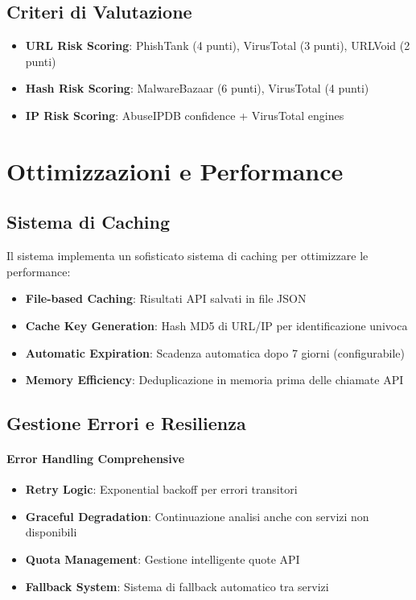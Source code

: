 \documentclass{article}
\begin{document}
\subsection{Criteri di Valutazione}

\begin{itemize}
    \item \textbf{URL Risk Scoring}: PhishTank (4 punti), VirusTotal (3 punti), URLVoid (2 punti)
    \item \textbf{Hash Risk Scoring}: MalwareBazaar (6 punti), VirusTotal (4 punti)
    \item \textbf{IP Risk Scoring}: AbuseIPDB confidence + VirusTotal engines
\end{itemize}

\section{Ottimizzazioni e Performance}

\subsection{Sistema di Caching}

Il sistema implementa un sofisticato sistema di caching per ottimizzare le performance:

\begin{itemize}
    \item \textbf{File-based Caching}: Risultati API salvati in file JSON
    \item \textbf{Cache Key Generation}: Hash MD5 di URL/IP per identificazione univoca
    \item \textbf{Automatic Expiration}: Scadenza automatica dopo 7 giorni (configurabile)
    \item \textbf{Memory Efficiency}: Deduplicazione in memoria prima delle chiamate API
\end{itemize}

\subsection{Gestione Errori e Resilienza}

\paragraph{Error Handling Comprehensive}

\begin{itemize}
    \item \textbf{Retry Logic}: Exponential backoff per errori transitori
    \item \textbf{Graceful Degradation}: Continuazione analisi anche con servizi non disponibili
    \item \textbf{Quota Management}: Gestione intelligente quote API
    \item \textbf{Fallback System}: Sistema di fallback automatico tra servizi
\end{itemize}
\end{document}
